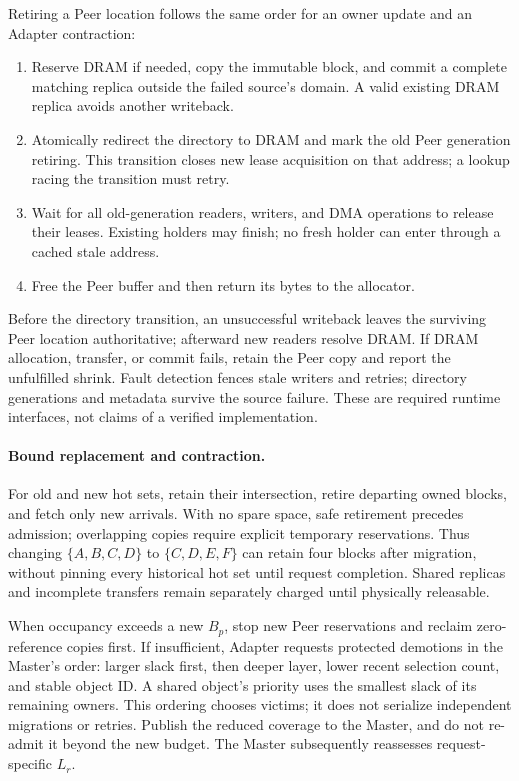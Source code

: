 Retiring a Peer location follows the same order for an owner update and
an Adapter contraction:
\begin{enumerate}
  \item Reserve DRAM if needed, copy the immutable block, and commit
    a complete matching replica outside the failed source's domain.
    A valid existing DRAM replica avoids another writeback.
  \item Atomically redirect the directory to DRAM and mark the old
    Peer generation retiring. This transition closes new lease acquisition
    on that address; a lookup racing the transition must retry.
  \item Wait for all old-generation readers, writers, and DMA operations
    to release their leases. Existing holders may finish; no fresh holder
    can enter through a cached stale address.
  \item Free the Peer buffer and then return its bytes to the allocator.
\end{enumerate}
Before the directory transition, an unsuccessful writeback leaves the
surviving Peer location authoritative; afterward new readers resolve DRAM.
If DRAM allocation, transfer, or commit fails, retain the Peer copy and
report the unfulfilled shrink.
Fault detection fences stale writers and retries; directory generations
and metadata survive the source failure. These are required runtime
interfaces, not claims of a verified implementation.

\paragraph{Bound replacement and contraction.}
For old and new hot sets, retain their intersection, retire departing
owned blocks, and fetch only new arrivals. With no spare space, safe
retirement precedes admission; overlapping copies require explicit
temporary reservations. Thus changing $\{A,B,C,D\}$ to $\{C,D,E,F\}$
can retain four blocks after migration, without pinning every historical
hot set until request completion. Shared replicas and incomplete transfers
remain separately charged until physically releasable.

When occupancy exceeds a new $B_p$, stop new Peer reservations and reclaim
zero-reference copies first. If insufficient, Adapter requests protected
demotions in the Master's order: larger slack first, then deeper layer,
lower recent selection count, and stable object ID. A shared object's
priority uses the smallest slack of its remaining owners. This ordering
chooses victims; it does not serialize independent migrations or retries.
Publish the reduced coverage to the Master, and do not re-admit it beyond
the new budget. The Master subsequently reassesses request-specific $L_r$.

